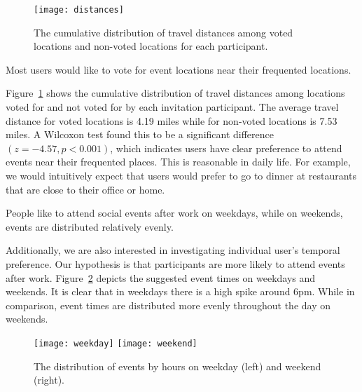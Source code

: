 \begin{figure}
\centering
\texttt{[image: distances]}
\caption{The cumulative distribution of travel distances among voted locations and non-voted locations for each participant.}
\label{fig:distance}
\end{figure}


\begin{observation}
Most users would like to vote for event locations near their frequented
locations.
\end{observation}
Figure~\ref{fig:distance} shows the cumulative distribution of travel distances
among locations voted for and not voted for by each invitation participant.
The average travel distance for voted locations is 4.19 miles while for
non-voted locations is 7.53 miles. A Wilcoxon test found this to be a
significant difference $(z = -4.57, p<0.001)$, which indicates users have clear
preference to attend events near their frequented places. This is reasonable in
daily life. For example, we would intuitively expect that users would prefer to
go to dinner at restaurants that are close to their office or home.

\begin{observation}
People like to attend social events after work on weekdays, while on weekends,
events are distributed relatively evenly.
\end{observation}
Additionally, we are also interested in investigating individual user's temporal preference. Our hypothesis is 
that participants are more likely to attend events after work. Figure~\ref{fig:weekday} depicts the suggested
event times on weekdays and weekends. It is clear that in weekdays there is a high spike around 6pm. While 
in comparison, event times are distributed more evenly throughout the day on weekends. 

\begin{figure}
\centering
\texttt{[image: weekday]}
\texttt{[image: weekend]}
\caption{The distribution of events by hours on weekday (left) and weekend (right).}
\label{fig:weekday}
\end{figure}

